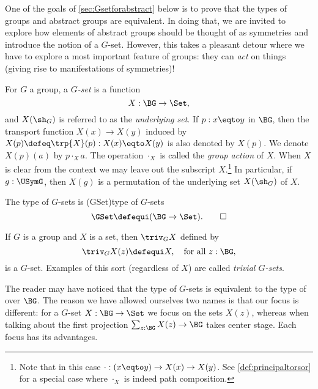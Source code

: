 One of the goals of \cref{sec:Gsetforabstract} below
is to prove that the types of groups and abstract groups are equivalent.
In doing that, we are invited to explore how elements of
abstract groups should be
thought of as symmetries and introduce the notion of a $G$-set.
However, this takes a pleasant detour where we have to explore a
most important feature of groups: they can \emph{act} on things
(giving rise to manifestations of symmetries)!


\begin{definition}\label{def:Gset}
  For $G$ a group, a \emph{$G$-set} is a function
  \[
    X : \BG\to\Set,
  \]
  and $X(\sh_G)$ is referred to as the \emph{underlying set}.
  If $p:x\eqto y$ in $\BG$,
  then the transport function $X(x)\to X(y)$ induced
  by $X(p)\defeq\trp{X}(p) : X(x)\eqto X(y)$ is also denoted by $X(p)$.
  We denote $X(p)(a)$ by $p\cdot_X a$.
  The operation $\cdot_X$ is called the \emph{group action} of $X$.
  When $X$ is clear from the context we may leave out the
  subscript $X$.\footnote{%
    Note that in this case $\cdot: (x\eqto y) \to X(x) \to X(y)$.
    See \cref{def:principaltorsor} for a special case
    where $\cdot_X$ is indeed path composition.}
  In particular, if $g:\USymG$,
  then $X(g)$ is a permutation of the underlying set $X(\sh_G)$ of $X$.

  The type of $G$-sets is
  \glossary(GSet){\protect{$\GSet$}}{type of $G$-sets}
  \[
    \GSet\defequi(\BG\to\Set).\qedhere
  \]
\end{definition}

\begin{example}\label{def:trivGset}
  If $G$ is a group and $X$ is a set, then $\triv_G X$ defined by
  \[\triv_G X(z)\defequi X, \quad\text{for all $z:\BG$,}\]
  is a $G$-set.
  Examples of this sort (regardless of $X$) are called \emph{trivial $G$-sets}.
\end{example}
\begin{remark}
  \label{rem:G-set-vs-set-bundle}
The reader may have noticed that the type of $G$-sets is equivalent to the
type of \coverings over $\BG$.
The reason we have allowed ourselves two names is that our focus is different: for a $G$-set $X:\BG\to\Set$ we focus on the sets $X(z)$, whereas when talking about \coverings the first projection $\sum_{z:\BG}X(z)\to \BG$ takes center stage.  Each focus has its advantages.
\end{remark}


